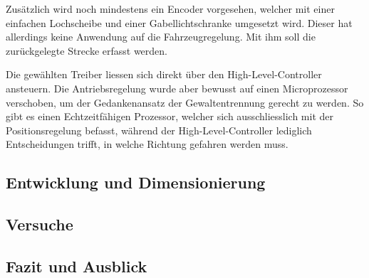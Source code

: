 \documentclass[main.tex]{subfiles} %
\begin{document}
Zusätzlich wird noch mindestens ein Encoder vorgesehen, welcher mit einer
einfachen Lochscheibe und einer Gabellichtschranke umgesetzt wird. Dieser hat
allerdings keine Anwendung auf die Fahrzeugregelung. Mit ihm soll die
zurückgelegte Strecke erfasst werden.

Die gewählten Treiber liessen sich direkt über den High-Level-Controller
ansteuern. Die Antriebsregelung wurde aber bewusst auf einen Microprozessor
verschoben, um der Gedankenansatz der Gewaltentrennung gerecht zu werden. So
gibt es einen Echtzeitfähigen Prozessor, welcher sich ausschliesslich mit der
Positionsregelung befasst, während der High-Level-Controller lediglich
Entscheidungen trifft, in welche Richtung gefahren werden muss.

\subsection{Entwicklung und Dimensionierung}

\subsection{Versuche}

\subsection{Fazit und Ausblick}
\end{document}
